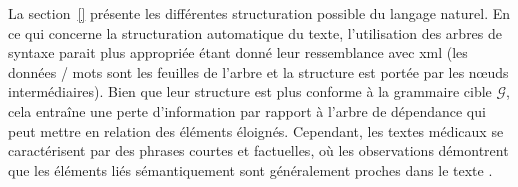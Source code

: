 
La section~\ref{} présente les différentes structuration possible du langage naturel.
En ce qui concerne la structuration automatique du texte, l'utilisation des arbres de syntaxe parait plus appropriée étant donné leur ressemblance avec \gls{xml} (les données / mots sont les feuilles de l'arbre et la structure est portée par les nœuds intermédiaires).
Bien que leur structure est plus conforme à la grammaire cible $\mathcal{G}$, cela entraîne une perte d'information par rapport à l'arbre de dépendance qui peut mettre en relation des éléments éloignés.
Cependant, les textes médicaux se caractérisent par des phrases courtes et factuelles, où les observations démontrent que les éléments liés sémantiquement sont généralement proches dans le texte \cite{savaryRelationExtractionClinical2022}.

